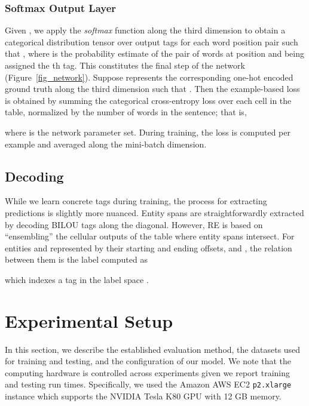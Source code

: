 \documentclass{clv3}
\newcommand*\circled[1]{\tikz[baseline=(char.base)]{
            \node[shape=circle,draw,inner sep=1pt] (char) {#1};}}
\begin{document}
\subsubsection{Softmax Output Layer}

Given , we apply the \textit{softmax} function along the third dimension to obtain a categorical distribution tensor over output tags  for each word position pair such that , where  is the probability estimate of the pair of words at position  and  being assigned the th tag. This constitutes the final step \circled{8} of the network (Figure~\ref{fig_network}). 
Suppose  represents the corresponding one-hot encoded  ground truth  along the third dimension such that . Then the example-based loss  is obtained by summing the categorical cross-entropy loss over each cell in the table, normalized by the number of words in the sentence; that is, 

where  is the network parameter set. During training, the loss  is computed per example and averaged along the mini-batch dimension.

\subsection{Decoding}\label{sec-decode}

While we learn concrete tags during training, the process for extracting predictions is slightly more nuanced. Entity spans are straightforwardly extracted by decoding BILOU tags along the diagonal. However, RE is based on ``ensembling'' the cellular outputs of the table where entity spans intersect. For entities  and  represented by their starting and ending offsets,  and , the relation between them is the label computed as  

which indexes a tag in the label space . 





\section{Experimental Setup}

In this section, we describe the established evaluation method, the datasets used for training and testing, and the configuration of our model. We note that the computing hardware is controlled across experiments given we  report training and testing run times. Specifically, we used the Amazon AWS EC2 \texttt{p2.xlarge} instance which supports the NVIDIA Tesla K80 GPU with 12 GB memory.
\end{document}
